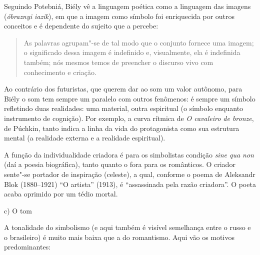 Seguindo Potebniá, Biély vê a linguagem poética como a linguagem das
imagens (\emph{óbraznyi iazik}), em que a imagem como símbolo foi
enriquecida por outros conceitos e é dependente do sujeito que a
percebe:

\begin{quote}
As palavras agrupam"-se de tal modo que o conjunto fornece uma imagem; o
significado dessa imagem é indefinido e, visualmente, ela é indefinida
também; nós mesmos temos de preencher o discurso vivo com conhecimento e
criação.
\end{quote}

Ao contrário dos futuristas, que querem dar ao som um valor autônomo,
para Biély o som tem sempre um paralelo com outros fenômenos: é sempre
um símbolo refletindo duas realidades: uma material, outra espiritual (o
símbolo enquanto instrumento de cognição). Por exemplo, a curva rítmica
de \emph{O cavaleiro de bronze}, de Púchkin, tanto indica a linha da
vida do protagonista como sua estrutura mental (a realidade externa e a
realidade espiritual).

A função da individualidade criadora é para os simbolistas condição
\emph{sine qua non} (daí a poesia biográfica), tanto quanto o fora para
os românticos. O criador sente"-se portador de inspiração (celeste), a
qual, conforme o poema de Aleksandr Blok (1880--1921) ``O artista''
(1913), é ``assassinada pela razão criadora''. O poeta acaba
oprimido por um tédio mortal.

\begin{flushleft}
c) O tom
\end{flushleft}

A tonalidade do simbolismo (e aqui também é visível semelhança entre o
russo e o brasileiro) é muito mais baixa que a do romantismo. Aqui vão
os motivos predominantes:

